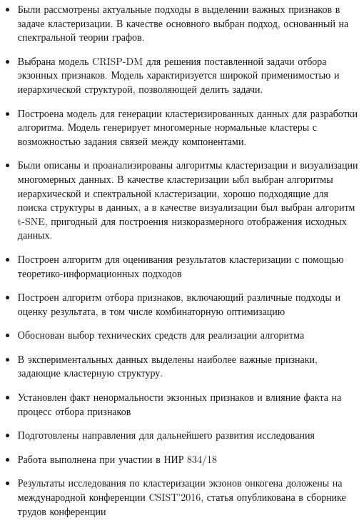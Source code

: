\begin{itemize}
	\item Были рассмотрены актуальные подходы в выделении важных признаков в задаче кластеризации. В качестве основного выбран подход, основанный на спектральной теории графов.
	\item Выбрана модель CRISP-DM для решения поставленной задачи отбора экзонных признаков. Модель характиризуется широкой применимостью и иерархической структурой, позволяющей делить задачи.
	\item Построена модель для генерации кластеризированных данных для разработки алгоритма. Модель генерирует многомерные нормальные кластеры с возможностью задания связей между компонентами.
	\item Были описаны и проанализированы алгоритмы кластеризации и визуализации многомерных данных. В качестве кластеризации ыбл выбран алгоритмы иерархической и спектральной кластеризации, хорошо подходящие для поиска структуры в данных, а в качестве визуализации был выбран алгоритм t-SNE, пригодный для построения низкоразмерного отображения исходных данных.
	\item Построен алгоритм для оценивания результатов кластеризации с помощью теоретико-информационных подходов
	\item Построен алгоритм отбора признаков, включающий различные подходы и оценку результата, в том числе комбинаторную оптимизацию
	\item Обоснован выбор технических средств для реализации алгоритма
	\item В экспериментальных данных выделены наиболее важные признаки, задающие кластерную структуру.
	\item Установлен факт ненормальности экзонных признаков и влияние факта на процесс отбора признаков
	\item Подготовлены направления для дальнейшего развития исследования
	\item Работа выполнена при участии в НИР 834/18
	\item Результаты исследования по кластеризации экзонов онкогена доложены на международной конференции CSIST'2016, статья опубликована в сборнике трудов конференции
\end{itemize}